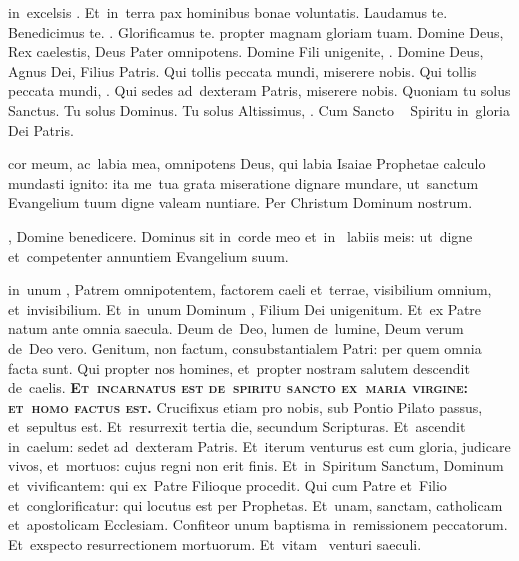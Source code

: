 \documentclass[first]{../altarcard}
\begin{document}
\begin{center}

	\fontsize{13.5}{16.2}\selectfont

	\begin{minipage}[t]{0.29\linewidth}

		\topgap

		 in~excelsis . Et~in~terra pax hominibus
		bonae voluntatis. Laudamus te. Benedicimus te. .
		Glorificamus te.  propter magnam gloriam tuam.
		Domine Deus, Rex caelestis, Deus Pater omnipotens. Domine Fili
		unigenite, . Domine Deus, Agnus Dei, Filius Patris.
		Qui tollis peccata mundi, miserere nobis. Qui tollis peccata mundi,
		. Qui sedes ad~dexteram Patris,
		miserere nobis. Quoniam tu solus Sanctus. Tu solus Dominus. Tu solus
		Altissimus, . Cum Sancto \cross~ Spiritu in~gloria
		Dei Patris. \amen

		\gapp

		 cor meum, ac~labia mea, omnipotens Deus, qui labia
		Isaiae Prophetae calculo mundasti ignito: ita me~tua grata miseratione
		dignare mundare, ut~sanctum Evangelium tuum digne valeam nuntiare. Per
		Christum Dominum nostrum. \amen

		\gapp

		, Domine benedicere. Dominus sit in~corde meo et~in~
		labiis meis: ut~digne et~competenter annuntiem Evangelium suum. \amen

		\gapp

		 in~unum , Patrem omnipotentem, factorem
		caeli et~terrae, visibilium omnium, et~invisibilium. Et~in~unum Dominum
		, Filium Dei unigenitum. Et~ex Patre natum ante
		omnia saecula. Deum de~Deo, lumen de~lumine, Deum verum de~Deo vero.
		Genitum, non factum, consubstantialem Patri: per quem omnia facta sunt.
		Qui propter nos homines, et~propter nostram salutem descendit de~caelis.
		\textcolor{newred}{\bfseries\scshape Et~incarnatus est de~spiritu sancto
			ex~maria virgine: et~homo factus est.} Crucifixus etiam pro nobis, sub
		Pontio Pilato passus, et~sepultus est. Et~resurrexit tertia die,
		secundum Scripturas. Et~ascendit in~caelum: sedet ad~dexteram Patris.
		Et~iterum venturus est cum gloria, judicare vivos, et~mortuos: cujus
		regni non erit finis. Et~in~Spiritum Sanctum, Dominum et~vivificantem:
		qui ex~Patre Filioque procedit. Qui cum Patre et~Filio  et~conglorificatur: qui locutus est per Prophetas. Et~unam,
		sanctam, catholicam et~apostolicam Ecclesiam. Confiteor unum baptisma
		in~remissionem peccatorum. Et~exspecto resurrectionem mortuorum.
		Et~vitam \cross~venturi saeculi. \amen


\end{minipage}
\end{center}
\end{document}
